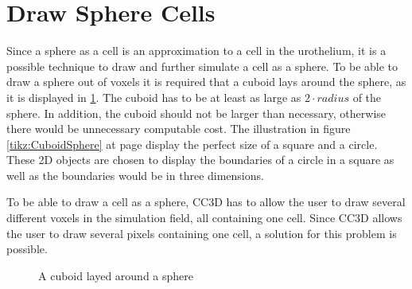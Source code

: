 \section{Draw Sphere Cells}\label{sec:DrawSphereCells}
Since a sphere as a cell is an approximation to a cell in the urothelium, it is a possible technique to draw and further simulate a cell as a sphere. \newline 
To be able to draw a sphere out of voxels it is required that a cuboid lays around the sphere, as it is displayed in \ref{tikz:SphereInCube}. The cuboid has to be at least as large as $2 \cdot radius$ of the sphere. In addition, the cuboid should not be larger than necessary, otherwise there would be unnecessary computable cost. The illustration in figure \ref{tikz:CuboidSphere} at page \pageref{tikz:CuboidSphere} display the perfect size of a square and a circle. These 2D objects are chosen to display the boundaries of a circle in a square as well as the boundaries would be in three dimensions.


To be able to draw a cell as a sphere, \ac{CC3D} has to allow the user to draw several different voxels in the simulation field, all containing one cell. Since \ac{CC3D} allows the user to draw several pixels containing one cell, a solution for this problem is possible.


\begin{figure}
\begin{center}
\caption{A cuboid layed around a sphere}
\label{tikz:SphereInCube}
\end{center}
\end{figure}


